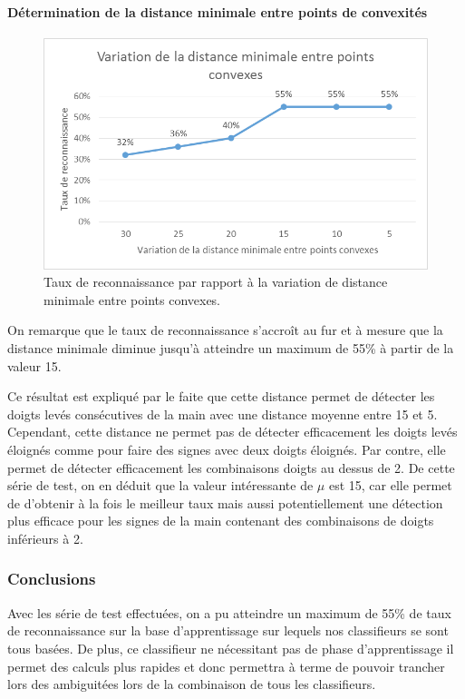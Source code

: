 \paragraph{Détermination de la distance minimale entre points de convexités}
\begin{figure}[htb!]
\centerline{\includegraphics{convexiteEntreMin.png}}
\caption{Taux de reconnaissance par rapport à la variation de distance minimale entre points convexes.}
\label{fig:convexiteEntreMin}
\end{figure}

On remarque que le taux de reconnaissance s’accroît au fur et à mesure que la distance minimale diminue jusqu’à atteindre un maximum de 55\% à partir de la valeur 15. 

Ce résultat est expliqué par le faite que cette distance permet de détecter les doigts levés consécutives de la main avec une distance moyenne entre 15 et 5. Cependant, cette distance ne permet pas de détecter efficacement les doigts levés éloignés comme pour faire des signes avec deux doigts éloignés. Par contre, elle permet de détecter efficacement les combinaisons doigts au dessus de 2. 
De cette série de test, on en déduit que la valeur intéressante de $\mu$ est 15, car elle permet de d’obtenir à la fois le meilleur taux mais aussi potentiellement une détection plus efficace pour les signes de la main contenant des combinaisons de doigts inférieurs à 2.

\subsubsection{Conclusions}
Avec les série de test effectuées, on a pu atteindre un maximum de 55\% de taux de reconnaissance sur la base d’apprentissage sur lequels nos classifieurs se sont tous basées. De plus, ce classifieur ne nécessitant pas de phase d’apprentissage il permet des calculs plus rapides et donc permettra à terme de pouvoir trancher lors des ambiguitées lors de la combinaison de tous les classifieurs.

